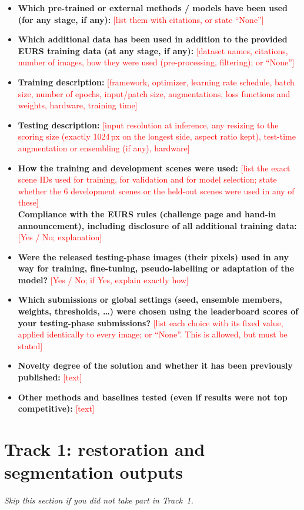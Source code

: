 \documentclass{article}
\newcommand{\todo}[1]{\textcolor{red}{[#1]}}
\begin{document}
\begin{itemize}
\item \textbf{Which pre-trained or external methods / models have been used (for any stage, if any):} \todo{list them with citations, or state ``None''}
\item \textbf{Which additional data has been used in addition to the provided EURS training data (at any stage, if any):} \todo{dataset names, citations, number of images, how they were used (pre-processing, filtering); or ``None''}
\item \textbf{Training description:} \todo{framework, optimizer, learning rate schedule, batch size, number of epochs, input/patch size, augmentations, loss functions and weights, hardware, training time}
\item \textbf{Testing description:} \todo{input resolution at inference, any resizing to the scoring size (exactly 1024\,px on the longest side, aspect ratio kept), test-time augmentation or ensembling (if any), hardware}
\item \textbf{How the training and development scenes were used:} \todo{list the exact scene IDs used for training, for validation and for model selection; state whether the 6 development scenes or the held-out scenes were used in any of these} \\
\textbf{Compliance with the EURS rules (challenge page and hand-in announcement), including disclosure of all additional training data:} \todo{Yes / No; explanation}
\item \textbf{Were the released testing-phase images (their pixels) used in any way for training, fine-tuning, pseudo-labelling or adaptation of the model?} \todo{Yes / No; if Yes, explain exactly how}
\item \textbf{Which submissions or global settings (seed, ensemble members, weights, thresholds, \dots) were chosen using the leaderboard scores of your testing-phase submissions?} \todo{list each choice with its fixed value, applied identically to every image; or ``None''. This is allowed, but must be stated}
\item \textbf{Novelty degree of the solution and whether it has been previously published:} \todo{text}
\item \textbf{Other methods and baselines tested (even if results were not top competitive):} \todo{text}
\end{itemize}

\section{Track 1: restoration and segmentation outputs}\label{sec:t1}
\emph{Skip this section if you did not take part in Track~1.}
\end{document}
